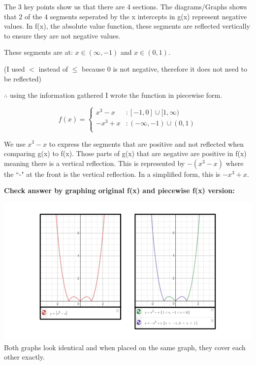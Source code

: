 \documentclass[12pt]{book}
\begin{document}
\begin{enumerate}
The 3 key points show us that there are 4 sections. The diagrams/Graphs shows that 2 of the 4 segments seperated by the x intercepts in g(x) represent negative values.
In f(x), the absolute value function, these segments are reflected vertically to ensure they are not negative values.
\vspace{1em}

\begin{center}
These segments are at: $ x \in (\infty, -1) $ and $ x \in (0, 1) $.

(I used $<$ instead of $\leq$ because 0 is not negative, therefore it does not need to be reflected)
\end{center}

$\therefore$ using the information gathered I wrote the function in piecewise form.
\vspace{1em}

$$
f(x) =
\begin{cases}
    x^3-x & :  [-1, 0] \cup [1, \infty)\\
    -x^3+x & : (-\infty, -1) \cup (0, 1)\\
\end{cases}
$$

\vspace{1em}
We use $x^3-x$ to express  the segments that are positive and not reflected when comparing g(x) to f(x).
\vspace{2em}
Those parts of g(x) that are negative are positive in f(x) meaning there is a vertical reflection. 
This is represented by $-(x^3-x)$ where the ``-" at the front is the vertical reflection. 
In a simplified form, this is $-x^3+x$.

\vspace{3em}
\textbf{Check answer by graphing original f(x) and piecewise f(x) version:}
\vspace{-1.5em}
\begin{center}
    \includegraphics[scale=0.5]{A1-4 proof.png}
    Both graphs look identical and when placed on the same graph, they cover each other exactly.
\end{center}


\end{enumerate}
\end{document}
